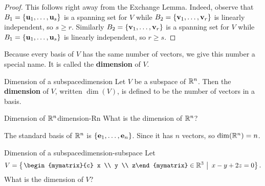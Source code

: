 \begin{proof}
  This follows right away from the Exchange Lemma. Indeed, observe
  that $B_1 = \set{\vect{u}_1,\ldots,\vect{u}_s}$ is a spanning
  set for $V$ while $ B_2 = \set{\vect{v}_1,\ldots,\vect{v}_r}$ is
  linearly independent, so $s\geq r$. Similarly
  $B_2 = \set{\vect{v}_1,\ldots,\vect{v}_r} $ is a spanning set
  for $V$ while $B_1 = \set{\vect{u}_1,\ldots, \vect{u}_s}$ is
  linearly independent, so $r\geq s$.
\end{proof}

Because every basis of $V$ has the same number of vectors, we give
this number a special name. It is called the \textbf{dimension} of
$V$.

\begin{definition}{Dimension of a subspace}{dimension}
  Let $V$ be a subspace of\/ $\mathbb{R}^n$. Then the \textbf{dimension}%
   of $V$, written $\dim(V)$, is
  defined to be the number of vectors in a basis.
\end{definition}

\begin{example}{Dimension of\/ $\mathbb{R}^n$}{dimension-Rn}
  What is the dimension of $\mathbb{R}^n$?
\end{example}

\begin{solution}
  The standard basis of $\mathbb{R}^n$ is
  $\set{\vect{e}_1,\ldots,\vect{e}_n}$. Since it has $n$ vectors,
  so $\dim(\mathbb{R}^n) = n$.
\end{solution}

\begin{example}{Dimension of a subspace}{dimension-subspace}
  Let
  \begin{equation*}
    V=\set{\left.
      \begin{mymatrix}{c} x \\ y \\ z\end{mymatrix}\in\R^3 ~\right\vert~
      x-y+2z = 0
    }.
  \end{equation*}
  What is the dimension of\/ $V$?
\end{example}

